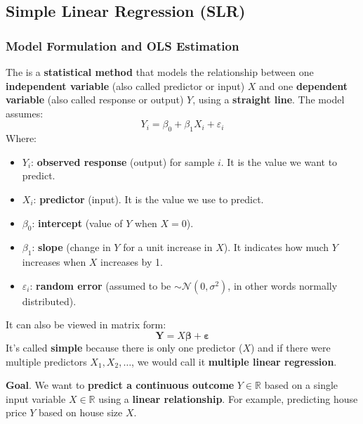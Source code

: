 \subsection{Simple Linear Regression (SLR)}

\subsubsection{Model Formulation and OLS Estimation}

The  is a \textbf{statistical method} that models the relationship between one \textbf{independent variable} (also called predictor or input) $X$ and one \textbf{dependent variable} (also called response or output) $Y$, using a \textbf{straight line}. The model assumes:
\begin{equation}
    Y_{i} = \beta_{0} + \beta_{1} X_{i} + \varepsilon_{i}
\end{equation}
Where:
\begin{itemize}
    \item $Y_i$: \textbf{observed response} (output) for sample $i$. It is the value we want to predict.
    \item $X_i$: \textbf{predictor} (input). It is the value we use to predict.
    \item $\beta_0$: \textbf{intercept} (value of $Y$ when $X = 0$).
    \item $\beta_1$: \textbf{slope} (change in $Y$ for a unit increase in $X$). It indicates how much $Y$ increases when $X$ increases by 1.
    \item $\varepsilon_i$: \textbf{random error} (assumed to be $\sim \mathcal{N}\left(0, \sigma^{2}\right)$, in other words normally distributed).
\end{itemize}
It can also be viewed in matrix form:
\begin{equation*}
    \mathbf{Y} = X \boldsymbol{\beta} + \boldsymbol{\varepsilon}
\end{equation*}
It's called \textbf{simple} because there is only one predictor ($X$) and if there were multiple predictors $X_{1}, X_{2}, \dots$, we would call it \textbf{multiple linear regression}.

\highspace
\textcolor{Green3}{ \textbf{Goal}}. We want to \textbf{predict a continuous outcome} $Y \in \mathbb{R}$ based on a single input variable $X \in \mathbb{R}$ using a \textbf{linear relationship}. For example, predicting house price $Y$ based on house size $X$.

